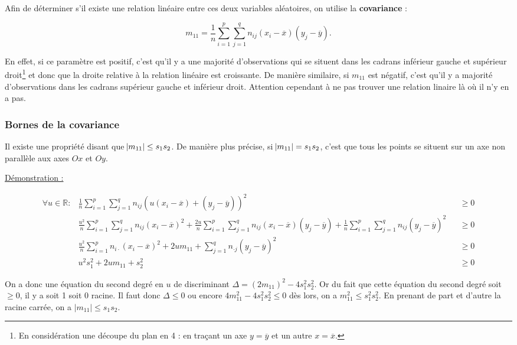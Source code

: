 \documentclass{article}
\begin{document}
		Afin de déterminer s'il existe une relation linéaire entre ces deux variables aléatoires, on utilise la \textbf{covariance} :

		\[m_{11} = \frac 1n\sum_{i=1}^p\sum_{j=1}^qn_{ij}(x_i-\overline x)(y_j-\overline y).\]

		En effet, si ce paramètre est positif, c'est qu'il y a une majorité d'observations qui se situent dans les cadrans inférieur gauche et supérieur droit\footnote{En
		considération une découpe du plan en 4 : en traçant un axe $y = \overline y$ et un autre $x = \overline x$.} et donc que la droite relative à la relation linéaire est
		croissante. De manière similaire, si $m_{11}$ est négatif, c'est qu'il y a majorité d'observations dans les cadrans supérieur gauche et inférieur droit.
		Attention cependant à ne pas trouver une relation linaire là où il n'y en a pas.

		\subsubsection{Bornes de la covariance}
			Il existe une propriété disant que $\abs {m_{11}} \leq s_1s_2$. De manière plus précise, si $\abs {m_{11}} = s_1s_2$, c'est que tous les points se situent sur un axe non
			parallèle aux axes $Ox$ et $Oy$.

			\underline{Démonstration :}

			\[\begin{aligned}
				\forall u \in \mathbb R : &\frac 1n\sum_{i=1}^p\sum_{j=1}^qn_{ij}(u(x_i-\overline x) + (y_j-\overline y))^2 &&\geq 0 \\
										  &\frac {u^2}n\sum_{i=1}^p\sum_{j=1}^qn_{ij}(x_i-\overline x)^2 + \frac {2u}n\sum_{i=1}^p\sum_{j=1}^qn_{ij}(x_i-\overline x)(y_j-\overline y) + \frac 1n\sum_{i=1}^p\sum_{j=1}^qn_{ij}(y_j-\overline y)^2 &&\geq 0 \\
										  & \frac {u^2}n\sum_{i=1}^pn_{i\cdot}(x_i-\overline x)^2 + 2u m_{11} + \sum_{j=1}^qn_{\cdot j}(y_j-\overline y)^2 &&\geq 0 \\
										  &u^2s_1^2 + 2um_{11} + s_2^2 &&\geq 0
			\end{aligned}\]

			On a donc une équation du second degré en $u$ de discriminant $\Delta = (2m_{11})^2 - 4s_1^2s_2^2$. Or du fait que cette équation du second degré soit $\geq 0$, il
			y a soit 1 soit 0 racine. Il faut donc $\Delta \leq 0$ ou encore $4m_{11}^2 - 4s_1^2s_2^2\leq 0$ dès lors, on a $m_{11}^2 \leq s_1^2s_2^2$. En prenant de part et
			d'autre la racine carrée, on a $|m_{11}| \leq s_1s_2$.
\end{document}
